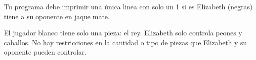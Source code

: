\documentclass{oci}
\begin{document}
\begin{outputDescription}
    Tu programa debe imprimir una única linea con solo un 1 si es
    Elizabeth (negras) tiene a su oponente en jaque mate.
\end{outputDescription}

\begin{scoreDescription}
  El jugador blanco tiene solo una pieza: el rey.
  Elizabeth solo controla peones y caballos. 
  No hay restricciones en la cantidad o tipo de piezas que Elizabeth y
  su oponente pueden controlar.
\end{scoreDescription}

\begin{sampleDescription}
\end{sampleDescription}
\end{document}
